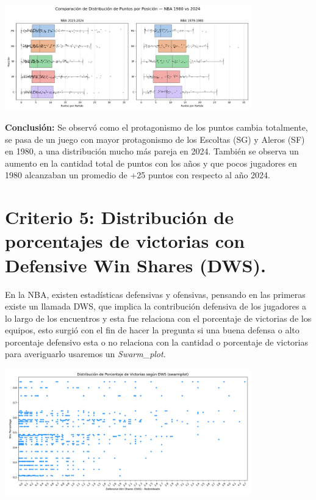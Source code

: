 \documentclass[12pt]{article}
\begin{document}
\begin{center}
    \includegraphics[width=0.8\textwidth]{boxplot.png}
\end{center}

\textbf{Conclusión:} Se observó como el protagonismo de los puntos cambia totalmente, se pasa de un juego con mayor protagonismo de los Escoltas (SG) y Aleros (SF) en 1980, a una distribución mucho más pareja en 2024. También se observa un aumento en la cantidad total de puntos con los años y que pocos jugadores en 1980 alcanzaban un promedio de +25 puntos con respecto al año 2024.


\section*{Criterio 5: Distribución de porcentajes de victorias con Defensive Win Shares (DWS).}

En la NBA, existen estadísticas defensivas y ofensivas, pensando en las primeras existe un llamada DWS, que implica la contribución defensiva de los jugadores a lo largo de los encuentros y esta fue relaciona con el porcentaje de victorias de los equipos, esto surgió con el fin de hacer la pregunta si una buena defensa o alto porcentaje defensivo esta o no relaciona con la cantidad o porcentaje de victorias para averiguarlo usaremos un \textit{Swarm_plot}.


\begin{center}
    \includegraphics[width=0.8\textwidth]{Swarmplot.png}
\end{center}
\end{document}
